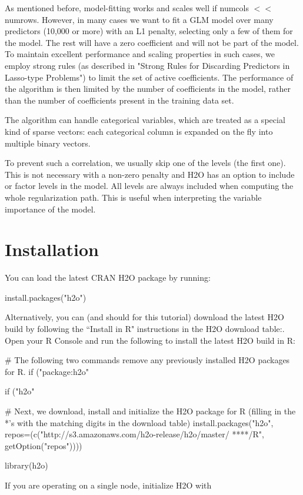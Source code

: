 \documentclass[11pt]{article}
\begin{document}
As mentioned before, model-fitting works and scales well if numcols $<<$ numrows. However, in many cases we want to fit a GLM model over many predictors (10,000 or more) with an L1 penalty, selecting only a few of them for the model. The rest will have a zero coefficient and will not be part of the model. To maintain excellent performance and scaling properties in such cases, we employ strong rules  (as described in "Strong Rules for Discarding Predictors in Lasso-type Problems") to limit the set of active coefficients. The performance of the algorithm is then limited by the number of coefficients in the model, rather than the number of coefficients present in the training data set. 

The algorithm can handle categorical variables, which are treated as a special kind of sparse vectors: each categorical column is expanded on the fly into multiple binary vectors. %

To prevent such a correlation, we usually skip one of the levels (the first one). This is not necessary with a non-zero penalty and H2O has an option to include or factor levels in the model. All levels are always included when computing the whole regularization path. This is useful when interpreting the variable importance of the model. 

\section{Installation} 

You can load the latest CRAN H2O package by running:

\begin{spverbatim}
install.packages("h2o")
\end{spverbatim}
\bigskip
\noindent
Alternatively, you can (and should for this tutorial) download the latest H2O build by following the ``Install in R" instructions in the H2O download table:. Open your R Console and run the following to install the latest H2O build in R:

\begin{spverbatim}
# The following two commands remove any previously installed H2O packages for R.
if ("package:h2o" %

if ("h2o" %

# Next, we download, install and initialize the H2O package for R (filling in the *'s with the matching digits in the download table)
install.packages("h2o", repos=(c("http://s3.amazonaws.com/h2o-release/h2o/master/
****/R", getOption("repos"))))

library(h2o)

\end{spverbatim}
\noindent
If you are operating on a single node, initialize H2O with
\end{document}
